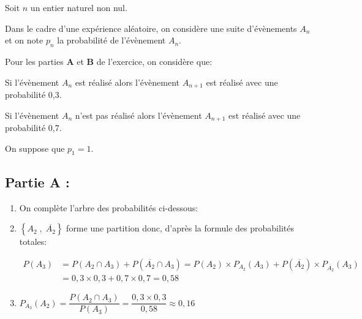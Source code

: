 Soit $n$ un entier naturel non nul.

Dans le cadre d'une expérience aléatoire, on considère une suite d'évènements $A_{n}$ et on note $p_{n}$ la probabilité de l'évènement $A_{n}$.

\begin{list}{\textbullet}{Pour les parties \textbf{A} et \textbf{B} de l'exercice, on considère que:}
\item Si l'évènement $A_{n}$ est réalisé alors l'évènement $A_{n+1}$ est réalisé avec une probabilité 0,3.
\item Si l'évènement $A_{n}$ n'est pas réalisé alors l'évènement $A_{n+1}$ est réalisé avec une probabilité 0,7.
\end{list}

On suppose que $p_{1}=1$.

\subsection*{Partie A :}

\begin{enumerate}
\item On complète l'arbre des probabilités ci-dessous:

\begin{center}
\bigskip
{}
{
	{
	}
	{
	}
}
\bigskip
\end{center}

\item 
$\left \{ A_2\;,\; \overline{A_2} \right \}$ forme une partition donc, d'après la formule des probabilités totales:

$\begin{aligned}
P\left (A_3\right )
& = P\left (A_2 \cap A_3\right ) +P\left (\overline{A_2} \cap A_3\right )
= P\left (A_2\right ) \times P_{A_2}\left (A_3\right ) + P\left (\overline{ A_2} \right ) \times P_{\overline{ A_2} }\left (A_3\right )\\
& = 0,3\times 0,3+0,7\times 0,7 = 0,58
\end{aligned}$

\item 
$P_{A_{3}}\left(A_{2}\right) = \dfrac{P\left (A_2 \cap A_3\right )}{P\left ( A_3\right )}
= \dfrac{0,3\times 0,3}{0,58}\approx 0,16$
\end{enumerate}


